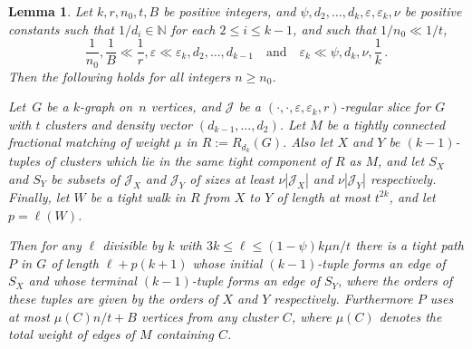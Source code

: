 \documentclass[12pt,a4paper]{amsart}
\let\eps\varepsilon
\newtheorem{lemma}[theorem] {Lemma}
\newcommand{\NATS}{\mathbb{N}}
\newcommand{\cJ}{\mathcal{J}}
\begin{document}
\begin{lemma}\label{lem:fracembrest}
  Let $k,r,n_0,t, B$ be positive integers, and
  $\psi,d_2,\ldots,d_k,\eps,\eps_k, \nu$ be positive constants such that
  $1/d_i\in\NATS$ for each $2\le i\le k-1$, and such
  that $1/n_0 \ll 1/t$,
  \[\frac{1}{n_0}, \frac{1}{B}\ll
  \frac{1}{r},\eps\ll\eps_k,d_2,\ldots,d_{k-1}\quad\text{and}\quad\eps_k\ll
  \psi,d_k, \nu, \frac{1}{k}\,.\]
  Then the following holds for all integers $n\ge n_0$.

  Let~$G$ be a $k$-graph
  on~$n$ vertices, and $\cJ$ be a $(\cdot,\cdot,\eps,\eps_k,r)$-regular slice
  for $G$ with $t$ clusters and density vector $(d_{k-1},\ldots,d_2)$. Let
  $M$ be a tightly connected fractional matching of weight $\mu$ in $R :=
  R_{d_k}(G)$. Also let $X$ and $Y$ be $(k-1)$-tuples of clusters which lie in
  the same tight component of $R$ as $M$, and let $S_X$ and $S_Y$ be subsets of
  $\cJ_X$ and $\cJ_Y$ of sizes at least $\nu|\cJ_X|$ and $\nu|\cJ_Y|$ respectively. Finally, let $W$ be a tight walk in $R$ from $X$ to $Y$ of length at most $t^{2k}$, and let $p=\ell(W)$.

  Then for any
  $\ell$ divisible by $k$ with $3k \leq \ell \leq (1-\psi)k\mu n/t$
  there is a tight path $P$ in $G$ of length $\ell+p(k+1)$ whose initial
  $(k-1)$-tuple forms an edge of $S_X$ and whose terminal $(k-1)$-tuple forms an edge of
  $S_Y$, where the orders of these tuples are given by the orders of $X$ and $Y$ respectively. Furthermore $P$ uses at most $\mu(C)n/t + B$ vertices from any
  cluster $C$, where $\mu(C)$ denotes the total weight of edges of $M$ containing $C$.
\end{lemma}
\end{document}
